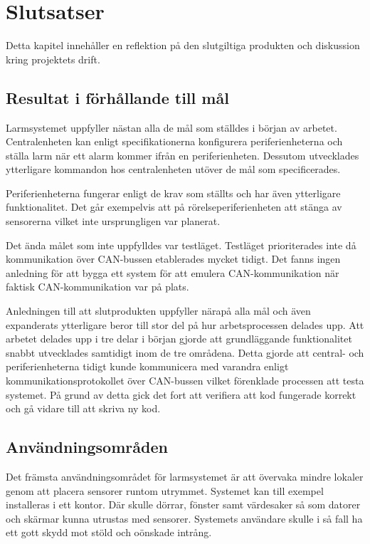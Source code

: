\documentclass[a4paper]{article}
\begin{document}

\newpage
\section{Slutsatser}
Detta kapitel innehåller en reflektion på den slutgiltiga produkten och diskussion kring projektets drift.

\subsection{Resultat i förhållande till mål}

Larmsystemet uppfyller nästan alla de mål som ställdes i början av arbetet.
Centralenheten kan enligt specifikationerna konfigurera periferienheterna och ställa larm när ett alarm kommer ifrån en periferienheten.
Dessutom utvecklades ytterligare kommandon hos centralenheten utöver de mål som specificerades.

Periferienheterna fungerar enligt de krav som ställts och har även ytterligare funktionalitet.
Det går exempelvis att på rörelseperiferienheten att stänga av sensorerna vilket inte ursprungligen var planerat.

Det ända målet som inte uppfylldes var testläget.
Testläget prioriterades inte då kommunikation över CAN-bussen etablerades mycket tidigt.
Det fanns ingen anledning för att bygga ett system för att emulera CAN-kommunikation när faktisk CAN-kommunikation var på plats.

Anledningen till att slutprodukten uppfyller närapå alla mål och även expanderats ytterligare beror till stor del på hur arbetsprocessen delades upp.
Att arbetet delades upp i tre delar i början gjorde att grundläggande funktionalitet snabbt utvecklades samtidigt inom de tre områdena.
Detta gjorde att central- och periferienheterna tidigt kunde kommunicera med varandra enligt kommunikationsprotokollet över CAN-bussen vilket förenklade processen att testa systemet.
På grund av detta gick det fort att verifiera att kod fungerade korrekt och gå vidare till att skriva ny kod.

\subsection{Användningsområden}
Det främsta användningsområdet för larmsystemet är att övervaka mindre lokaler genom att placera sensorer runtom utrymmet.
Systemet kan till exempel installeras i ett kontor.
Där skulle dörrar, fönster samt värdesaker så som datorer och skärmar kunna utrustas med sensorer.
Systemets användare skulle i så fall ha ett gott skydd mot stöld och oönskade intrång.
\end{document}
